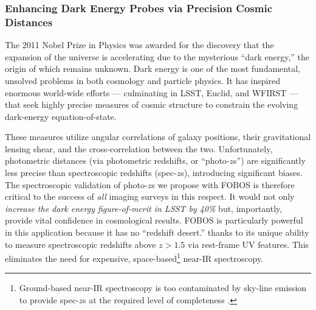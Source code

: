 \documentclass[oneside,11pt]{amsart}
\begin{document}
\subsubsection{Enhancing Dark Energy Probes via Precision Cosmic Distances}
\label{sec:cosmology}

The 2011 Nobel Prize in Physics was awarded for the discovery that the
expansion of the universe is accelerating due to the mysterious ``dark
energy,'' the origin of which remains unknown.  Dark energy is one of
the most fundamental, unsolved problems in both cosmology and particle
physics.  It has inspired enormous world-wide efforts --- culminating in
LSST, Euclid, and WFIRST --- that seek highly precise measures of cosmic
structure to constrain the evolving dark-energy equation-of-state.

These measures utilize angular correlations of galaxy positions, their
gravitational lensing shear, and the cross-correlation between the two.
Unfortunately, photometric distances (via photometric redshifts, or
``photo-$z$s'') are significantly less precise than spectroscopic
redshifts (spec-$z$s), introducing significant biases.  The
spectroscopic validation of photo-$z$s we propose with FOBOS is
therefore critical to the success of {\it all} imaging surveys in this
respect. It would not only \emph{increase the dark energy
figure-of-merit in LSST by 40\%} \citep{newman15} but, importantly,
provide vital confidence in cosmological results.  FOBOS is particularly
powerful in this application because it has no ``redshift desert.'' thanks to its unique ability to measure spectroscopic redshifts above $z > 1.5$ via
rest-frame UV features.  This eliminates the need for expensive, space-based\footnote{Ground-based near-IR
spectroscopy is too contaminated by sky-line emission to provide spec-$z$s at the required level of completeness
\citep{newman15}.} near-IR spectroscopy.
\end{document}
